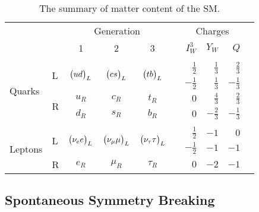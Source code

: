 \begingroup
\renewcommand*{\arraystretch}{1.2}
\begin{table}[ht]
  \centering
  \begin{tabular}{llccccrrrr}
    \toprule
    &                              &  \multicolumn{3}{c}{Generation} &  & \multicolumn{3}{c}{Charges} \\ \cline{7-9}  \cline{3-5}
    &                              &   1    &   2    &   3   &  &    $I^3_W$    &   $Y_W$    &  $Q$    \\ \hline\\[-13pt]
    \multirow{4}{*}{Quarks} & \multirow{2}{*}{L}
    &\multirow{2}{*}{$\pmqty{u\\d}_L$}&\multirow{2}{*}{$\pmqty{c\\s}_L$}&\multirow{2}{*}{$\pmqty{t\\b}_L$}&  &  $\frac{1}{2}$ &$\frac{1}{3}$ &$\frac{2}{3}$\\
    &                              &       &             &  & &  $-\frac{1}{2}$    & $\frac{1}{3}$&  $-\frac{1}{3}$    \\
    & \multirow{2}{*}{R}&  $u_R$     & $c_R$ &$t_R$      & &  $0$    & $\frac{4}{3}$&  $\frac{2}{3}$    \\
    &                              &  $d_R$     & $s_R$ &$b_R$    &  &  $0$     &$-\frac{2}{3}$&  $-\frac{1}{3}$    \\ [1pt] \cline{1-9} \\[-13pt]
    \multirow{4}{*}{Leptons}& \multirow{2}{*}{L} &\multirow{2}{*}{$\pmqty{\nu_{e}\\e}_L$}&\multirow{2}{*}{$\pmqty{\nu_{\mu}\\\mu}_L$}&\multirow{2}{*}{$\pmqty{\nu_{\tau}\\ \tau}_L$}
      & & $\frac{1}{2}$&$-1$&$0$\\
  &                              &       &       &      & & $-\frac{1}{2}$&$-1$ &   $-1$   \\
  &R& $e_R$      &  $\mu_R$      &    $\tau_R$  & & $0$ &$-2$ & $-1$     \\
  \bottomrule
\end{tabular}
\caption{The summary of matter content of the SM.}
  \label{tab:smmatter}
\end{table}
\endgroup

\subsection{Spontaneous Symmetry Breaking}
\label{sec:gws}

